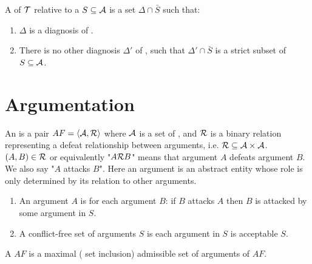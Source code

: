 \begin{defi} A  of $\mathcal{T}$ relative to a $S\subseteq\mathcal{A}$ is a set $\Delta\cap\bar{S}$ such that:
\begin{enumerate}
 \item $\Delta$ is a diagnosis of .
 \item There is no other diagnosis $\Delta'$ of , such that $\Delta'\cap\bar{S}$ is a strict subset of $S\subseteq\mathcal{A}$.
\end{enumerate}
\cite{conf/ijcai/RaimanKS93}
\end{defi}

\section{Argumentation}

\begin{defi}
An  is a pair $AF=\left\langle \mathcal{A},\mathcal{R}\right\rangle$ where $\mathcal{A}$ is a set of , and $\mathcal{R}$ is a binary relation representing a defeat relationship between arguments, i.e. $\mathcal{R}\subseteq\mathcal{A}\times\mathcal{A}$. $\left( A,B\right)\in\mathcal{R}$ or equivalently "$A\mathcal{R} B$" means that argument $A$ defeats argument $B$. We also say "$A$ attacks $B$". Here an argument is an abstract entity whose role is only determined by its relation to other arguments.
\cite{conf/ijcai/Dung93}
\end{defi}

\begin{defi}
\begin{enumerate}
 \item An argument $A$ is  \iffTx{} for each argument $B$: if $B$ attacks $A$ then $B$ is attacked by some argument in $S$.
 \item A conflict-free set of arguments $S$ is  \iffTx{} each argument in $S$ is acceptable \wrtTx{} $S$.
\end{enumerate}
\cite{conf/ijcai/Dung93}
\end{defi}

\begin{defi}
A  $AF$ is a maximal (\wrtTx{} set inclusion) admissible set of arguments of $AF$.
\cite{conf/ijcai/Dung93}
\end{defi}


